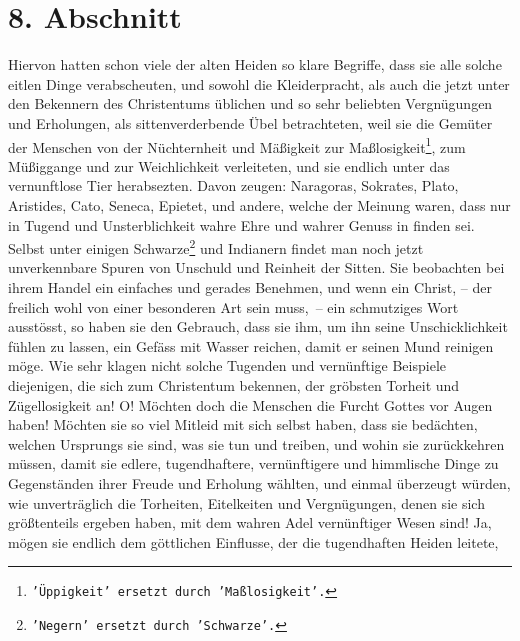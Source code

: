 \section{8. Abschnitt} \label{kap14_ab8}

Hiervon hatten schon viele der alten Heiden so klare
Begriffe, dass sie alle
solche eitlen Dinge verabscheuten, und sowohl die Kleiderpracht, als auch die
jetzt unter den Bekennern des Christentums üblichen und so sehr beliebten
Vergnügungen und Erholungen, als sittenverderbende Übel betrachteten, weil sie
die Gemüter der Menschen von der Nüchternheit und Mäßigkeit zur
Maßlosigkeit\footnote{\texttt{'Üppigkeit'
ersetzt durch 'Maßlosigkeit'.}}, zum
Müßiggange und zur Weichlichkeit verleiteten, und sie
endlich
unter das
vernunftlose Tier herabsezten. Davon zeugen:
Naragoras, Sokrates,
Plato,
Aristides, Cato,
Seneca,
Epietet, und andere, welche der Meinung waren, dass nur
in
Tugend und Unsterblichkeit wahre Ehre und wahrer
Genuss in
finden sei. Selbst
unter einigen Schwarze\footnote{\texttt{'Negern' ersetzt durch 'Schwarze'.}}
 und Indianern findet man noch
jetzt unverkennbare
Spuren
von Unschuld und Reinheit der Sitten. Sie beobachten bei ihrem Handel ein
einfaches und gerades Benehmen, und wenn ein Christ, --
der freilich wohl von
einer besonderen Art sein muss,~-- ein schmutziges Wort ausstösst, so haben sie
den
Gebrauch, dass sie ihm, um ihn seine Unschicklichkeit fühlen zu lassen, ein
Gefäss mit Wasser reichen, damit er seinen Mund reinigen möge. Wie sehr klagen
nicht solche Tugenden und vernünftige Beispiele diejenigen, die sich zum
Christentum bekennen, der gröbsten Torheit und Zügellosigkeit an! O! Möchten
doch die Menschen die Furcht Gottes vor Augen haben! Möchten sie so viel Mitleid
mit sich selbst haben, dass sie bedächten, welchen Ursprungs sie sind, was sie
tun und treiben, und wohin sie zurückkehren müssen, damit sie edlere,
tugendhaftere, vernünftigere und himmlische Dinge zu Gegenständen ihrer Freude
und Erholung wählten, und einmal überzeugt würden, wie unverträglich die
Torheiten, Eitelkeiten und Vergnügungen, denen sie sich größtenteils ergeben
haben, mit dem wahren Adel vernünftiger Wesen sind! Ja, mögen sie endlich dem
göttlichen Einflusse, der die tugendhaften
Heiden leitete,
